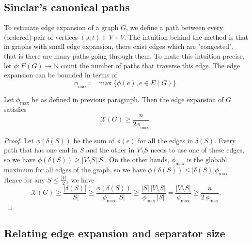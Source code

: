 \subsection{Sinclar's canonical paths}

To estimate edge expansion of a graph $G$, we define a path between every (ordered) pair of vertices $(s,t) \in V \times V$.
The intuition behind the method is that in graphs with small edge expansion, there exist edges which are "congested", that is there
are many paths going through them. To make this intuition precise, let $\phi: E(G) \rightarrow \mathbb{N}$ count the number of paths
that traverse this edge. The edge expansion can be bounded 
in terms of
\begin{equation}
\phi_{\max} \coloneqq \max \{ \phi(e), e \in E(G) \}.
\end{equation}


\begin{lemma}
\label{Sinclair}
Let $\phi_{\max}$ be as defined in previous paragraph. Then the edge expansion of $G$ satisfies 
\begin{equation}
\mathcal{X}(G) \ge \frac{n}{2 \phi_{\max}}.
\end{equation}
\end{lemma}

\begin{proof}
Let $\phi(\delta(S))$ be the sum of $\phi(e)$ for all the edges in $\delta(S)$. Every path that has one end in $S$
and the other in $V\setminus S$ needs to use one of these edges, so we have $\phi(\delta(S)) \ge   |V\setminus S | |S |$.
On the other hands, $\phi_{\max}$ is the globabl maximum for all edges of the graph, so we have $\phi(\delta(S)) \le  |\delta(S) |\phi_{\max}$.
Hence for any $S \le \frac{ |V |}{2}$, we have
\[
 \mathcal{X}(G) \ge \frac{|\delta(S)|}{|S|} 
                \ge \frac{\phi(\delta(S))}{\phi_{\max}\,|S|}
                \ge \frac{|S|\,|V{\setminus}S|}{\phi_{\max}\,|S|}
                 =  \frac{|V{\setminus}S|}{\phi_{\max}}
				\ge \frac{n}{2\,\phi_{\max}}.
\]
\end{proof} 
\subsection{Relating edge expansion and separator size}


